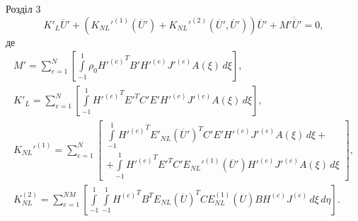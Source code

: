 \documentclass[8pt]{beamer}
\numberwithin{figure}{section}
\numberwithin{equation}{section}
\numberwithin{table}{section}
\begin{document}
\begin{frame}{Розділ 3}
\begin{equation}
K'_L\overline{U}'+\left( K_{NL}'^{(1)}\left( \overline{U}'\right)+K_{NL}'^{(2)}\left( \overline{U}',\overline{U}'\right) \right)\overline{U}'+M'\ddot{\overline{U}}'=0,
\end{equation}
де 
\begin{gather}
M'=\sum_{e=1}^{N}
\left[ \int\limits_{-1}^{1} \rho_0 {H'^{(e)}}^T B' H'^{(e)} J'^{(e)} A\left(\xi\right) \, d\xi \right],\\
K'_L=\sum_{e=1}^{N}
\left[ \int\limits_{-1}^{1}{H'^{(e)}}^T E'^T C' E' H'^{(e)} J'^{(e)} A\left(\xi\right) \, d\xi \right],\\
K_{NL}'^{(1)}=\sum_{e=1}^{N}
\left[ 
\begin{aligned}
\int\limits_{-1}^{1} {H'^{(e)}}^T E'_{NL}\left( \overline{U}'\right)^T C' E' H'^{(e)} J'^{(e)} A\left(\xi\right) \, d\xi  + \\ 
+ \int\limits_{-1}^{1} {H'^{(e)}}^T E'^T C' E_{NL}'^{(1)}\left( \overline{U}'\right) H'^{(e)} J'^{(e)} A\left(\xi\right) \, d\xi 
\end{aligned} 
\right],\\
K_{NL}^{(2)}=\sum_{e=1}^{NM}
\left[ 
\int\limits_{-1}^{1} \int\limits_{-1}^{1} {H^{(e)}}^T B^T E_{NL}\left( \overline{U}\right)^T C E_{NL}^{(1)}\left( \overline{U}\right) B H^{(e)} J^{(e)} \, d\xi \, d\eta 
\right].
\end{gather}

\end{frame}
\end{document}
